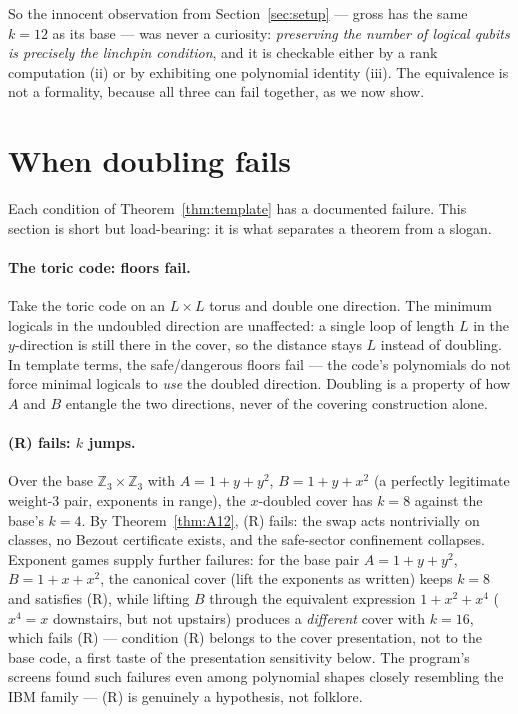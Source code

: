 \documentclass[11pt]{article}
\theoremstyle{plain}
\theoremstyle{definition}
\theoremstyle{remark}
\newcommand{\Z}{\mathbb{Z}}
\begin{document}
So the innocent observation from Section~\ref{sec:setup} --- gross has the
same $k = 12$ as its base --- was never a curiosity: \emph{preserving the
number of logical qubits is precisely the linchpin condition}, and it is
checkable either by a rank computation (ii) or by exhibiting one polynomial
identity (iii). The equivalence is not a formality, because all three can
fail together, as we now show.

\section{When doubling fails}
\label{sec:failures}

Each condition of Theorem~\ref{thm:template} has a documented failure. This
section is short but load-bearing: it is what separates a theorem from a
slogan.

\paragraph{The toric code: floors fail.}
Take the toric code on an $L \times L$ torus and double one direction. The
minimum logicals in the undoubled direction are unaffected: a single loop of
length $L$ in the $y$-direction is still there in the cover, so the distance
stays $L$ instead of doubling. In template terms, the safe/dangerous floors
fail --- the code's polynomials do not force minimal logicals to \emph{use}
the doubled direction. Doubling is a property of how $A$ and $B$ entangle the
two directions, never of the covering construction alone.

\paragraph{(R) fails: $k$ jumps.}
Over the base $\Z_3 \times \Z_3$ with $A = 1 + y + y^2$, $B = 1 + y + x^2$
(a perfectly legitimate weight-3 pair, exponents in range), the $x$-doubled
cover has $k = 8$ against the base's $k = 4$. By Theorem~\ref{thm:A12}, (R)
fails: the swap acts nontrivially on classes, no Bezout certificate exists,
and the safe-sector confinement collapses. Exponent games supply further
failures: for the base pair $A = 1 + y + y^2$, $B = 1 + x + x^2$, the
canonical cover (lift the exponents as written) keeps $k = 8$ and satisfies
(R), while lifting $B$ through the equivalent expression $1 + x^2 + x^4$
($x^4 = x$ downstairs, but not upstairs) produces a \emph{different} cover
with $k = 16$, which fails (R) --- condition (R) belongs to the cover
presentation, not to the base code, a first taste of the presentation
sensitivity below. The program's screens found such failures even among
polynomial shapes closely resembling the IBM family --- (R) is genuinely a
hypothesis, not folklore.
\end{document}

